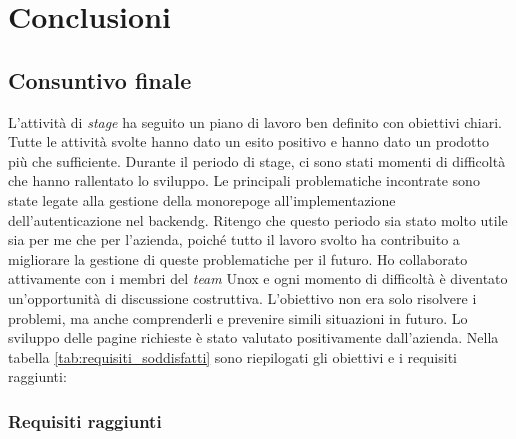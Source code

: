 \chapter{Conclusioni}
\label{chap:conclusioni}
\section{Consuntivo finale}

L'attività di \textit{stage} ha seguito un piano di lavoro ben definito con obiettivi chiari.
Tutte le attività svolte hanno dato un esito positivo e hanno dato un prodotto più che sufficiente.
Durante il periodo di stage, ci sono stati momenti di difficoltà che hanno rallentato lo sviluppo.
Le principali problematiche incontrate sono state legate alla gestione della \gls{monorepog}\glox e all'implementazione dell'autenticazione nel \gls{backendg}\glox.
Ritengo che questo periodo sia stato molto utile sia per me che per l'azienda, poiché tutto il lavoro svolto ha contribuito a migliorare la gestione di queste problematiche per il futuro.
Ho collaborato attivamente con i membri del \textit{team} Unox e ogni momento di difficoltà è diventato un'opportunità di discussione costruttiva.
L'obiettivo non era solo risolvere i problemi, ma anche comprenderli e prevenire simili situazioni in futuro.
Lo sviluppo delle pagine richieste è stato valutato positivamente dall'azienda.
Nella tabella \ref{tab:requisiti_soddisfatti} sono riepilogati gli obiettivi e i requisiti raggiunti:

\pagebreak
\subsection{Requisiti raggiunti}


